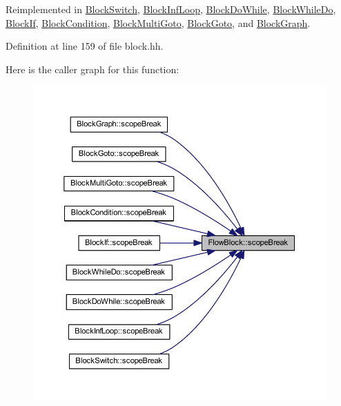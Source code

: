 Reimplemented in \mbox{\hyperlink{class_block_switch_a85ad912114b4e2ac355ac2bc2f3be12c}{Block\+Switch}}, \mbox{\hyperlink{class_block_inf_loop_ad1f92e4b37d7bf19cc409d353ad281ae}{Block\+Inf\+Loop}}, \mbox{\hyperlink{class_block_do_while_a6a6254c0020641ccffd791f6206461cc}{Block\+Do\+While}}, \mbox{\hyperlink{class_block_while_do_a87ab7a000da06ffdca299db53495eae0}{Block\+While\+Do}}, \mbox{\hyperlink{class_block_if_afeafc0ad59b47dde90d4b477a2ef7637}{Block\+If}}, \mbox{\hyperlink{class_block_condition_ab25a80cf066d355146cd5b4a67d91f46}{Block\+Condition}}, \mbox{\hyperlink{class_block_multi_goto_a1957286b0a3a4a2d280caae3c1f19cc7}{Block\+Multi\+Goto}}, \mbox{\hyperlink{class_block_goto_ad409112a4ad46f076a923bd152428a83}{Block\+Goto}}, and \mbox{\hyperlink{class_block_graph_a55618dfd49266bd4185d119f08e8b630}{Block\+Graph}}.



Definition at line 159 of file block.\+hh.

Here is the caller graph for this function\+:
\nopagebreak
\begin{figure}[H]
\begin{center}
\leavevmode
\includegraphics[width=350pt]{class_flow_block_a392611cfd24306f58ea6e18371809223_icgraph}
\end{center}
\end{figure}
\mbox{\label{class_flow_block_a9a47416c1462a0fc5069afb8c7ed5b1c}} 

